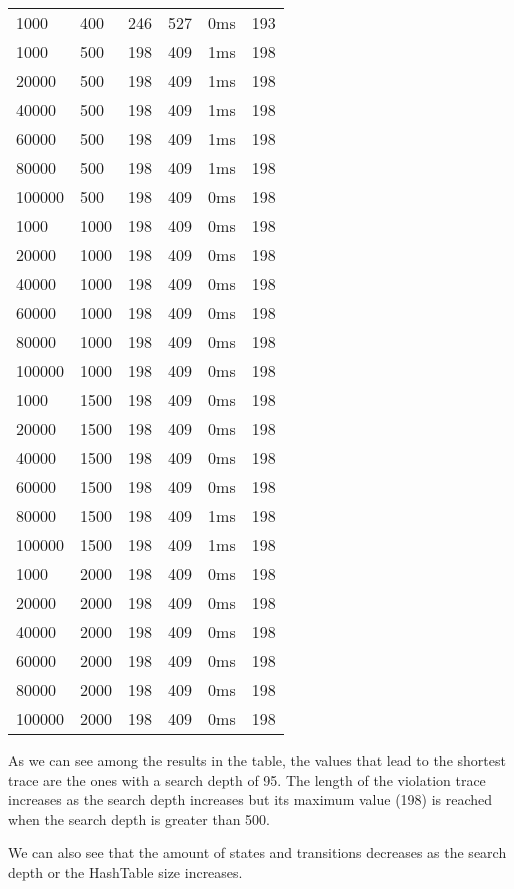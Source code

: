\begin{longtable}{l|l|l|l|l|l}
1000 & 400 & 246 & 527 & 0ms & 193 \\
1000 & 500 & 198 & 409 & 1ms & 198 \\
20000 & 500 & 198 & 409 & 1ms & 198 \\
40000 & 500 & 198 & 409 & 1ms & 198 \\
60000 & 500 & 198 & 409 & 1ms & 198 \\
80000 & 500 & 198 & 409 & 1ms & 198 \\
100000 & 500 & 198 & 409 & 0ms & 198 \\
1000 & 1000 & 198 & 409 & 0ms & 198 \\
20000 & 1000 & 198 & 409 & 0ms & 198 \\
40000 & 1000 & 198 & 409 & 0ms & 198 \\
60000 & 1000 & 198 & 409 & 0ms & 198 \\
80000 & 1000 & 198 & 409 & 0ms & 198 \\
100000 & 1000 & 198 & 409 & 0ms & 198 \\
1000 & 1500 & 198 & 409 & 0ms & 198 \\
20000 & 1500 & 198 & 409 & 0ms & 198 \\
40000 & 1500 & 198 & 409 & 0ms & 198 \\
60000 & 1500 & 198 & 409 & 0ms & 198 \\
80000 & 1500 & 198 & 409 & 1ms & 198 \\
100000 & 1500 & 198 & 409 & 1ms & 198 \\
1000 & 2000 & 198 & 409 & 0ms & 198 \\
20000 & 2000 & 198 & 409 & 0ms & 198 \\
40000 & 2000 & 198 & 409 & 0ms & 198 \\
60000 & 2000 & 198 & 409 & 0ms & 198 \\
80000 & 2000 & 198 & 409 & 0ms & 198 \\
100000 & 2000 & 198 & 409 & 0ms & 198 \\
\end{longtable}

As we can see among the results in the table, the values that lead to the shortest trace are the ones with a search depth of 95. The length of the violation trace increases as the search depth increases but its maximum value (198) is reached when the search depth is greater than 500. \newline

We can also see that the amount of states and transitions decreases as the search depth or the HashTable size increases. \newline
